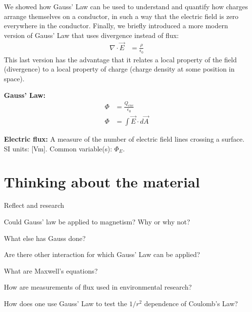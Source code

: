 \begin{chapterSummary}
\begin{enumerate}
\end{enumerate}
We showed how Gauss' Law can be used to understand and quantify how charges arrange themselves on a conductor, in such a way that the electric field is zero everywhere in the conductor. Finally, we briefly introduced a more modern version of Gauss' Law that uses divergence instead of flux:
\begin{align*}
\nabla \cdot \vec E &= \frac{\rho}{\epsilon_0}
\end{align*}
This last version has the advantage that it relates a local property of the field (divergence) to a local property of charge (charge density at some position in space). 




\end{chapterSummary}

\newpage
\begin{importantEquations}
\medskip
\begin{multicols}{2}
\textbf{Gauss' Law:}
\begin{align*}
\Phi & = \frac{Q_{enc}}{\epsilon_0}\\
\Phi &= \int \vec E \cdot d \vec A
\end{align*}
\columnbreak

\end{multicols}
\end{importantEquations}


\begin{definitions}
\item	\textbf{Electric flux:} A measure of the number of electric field lines crossing a surface. SI units: [\si{Vm}]. Common variable(s): $\Phi_E$.
\end{definitions}


\newpage
\section{Thinking about the material}

\begin{chapteractivity}{Reflect and research}
{
\item Could Gauss' law be applied to magnetism? Why or why not?
\item What else has Gauss done?
\item Are there other interaction for which Gauss' Law can be applied?
\item What are Maxwell's equations? 
\item How are measurements of flux used in environmental research?
\item How does one use Gauss' Law to test the $1/r^2$ dependence of Coulomb's Law?
}
\end{chapteractivity}


